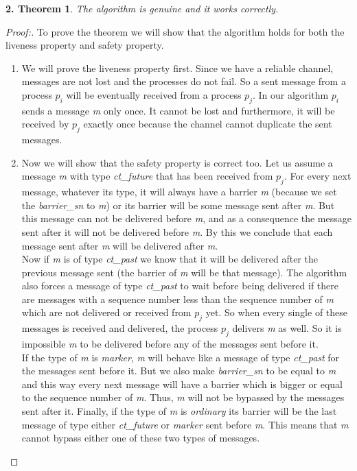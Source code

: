 \documentclass[12pt]{article}
\theoremstyle{plain}
\begin{document}
\newtheorem*{th1}{2.  Theorem}
\begin{th1}
  The algorithm is genuine and it works correctly.
\end{th1}
\begin{proof}[Proof:]
  To prove the theorem we will show that the algorithm holds for both the
  liveness property and safety property.
  \begin{enumerate}
    \item We will prove the liveness property first. Since we have a reliable
      channel, messages are not lost and the processes do not fail. So a sent 
      message from a process $p_i$ will be eventually received  from a process 
      $p_j$. In our algorithm $p_i$ sends a message \emph{m} only once. It
      cannot be lost and furthermore, it will be received by $p_j$ exactly once
      because the channel cannot duplicate the sent messages. 
    \item Now we will show that the safety property is correct too. Let us
      assume a message \emph{m} with type \emph{ct\_future} that has been
      received from $p_j$. For every next message, whatever its type, it will
      always have a barrier \emph{m} (because we set the \emph{barrier\_sn} to
      \emph{m}) or its barrier will be some message sent after \emph{m}. But
      this message can not be delivered before \emph{m}, and as a consequence
      the message sent after it will not be delivered before \emph{m}. By this
      we conclude that each message sent after \emph{m} will be delivered after
      \emph{m}. \\
      Now if \emph{m} is of type \emph{ct\_past} we know that it will be
      delivered after the previous message sent (the barrier of \emph{m} will be
      that message). The algorithm also forces a message of type \emph{ct\_past}
      to wait before being delivered if there are messages with a sequence
      number less than the sequence number of \emph{m} which are not delivered
      or received from $p_j$ yet. So when every single of these messages is
      received and delivered, the process $p_j$ delivers \emph{m} as well. So it
      is impossible \emph{m} to be delivered before any of the messages sent
      before it. \\
      If the type of \emph{m} is \emph{marker}, \emph{m} will behave like a
      message of type \emph{ct\_past} for the messages sent before it. But we
      also make \emph{barrier\_sn} to be equal to \emph{m} and this way every
      next message will have a barrier which is bigger or equal to the sequence
      number of \emph{m}. Thus, \emph{m} will not be bypassed by the messages
      sent after it.
      Finally, if the type of \emph{m} is \emph{ordinary} its barrier will be
      the last message of type either \emph{ct\_future} or \emph{marker} sent
      before \emph{m}. This means that \emph{m} cannot bypass either one of
      these two types of messages.
  \end{enumerate}
\end{proof}
\end{document}
